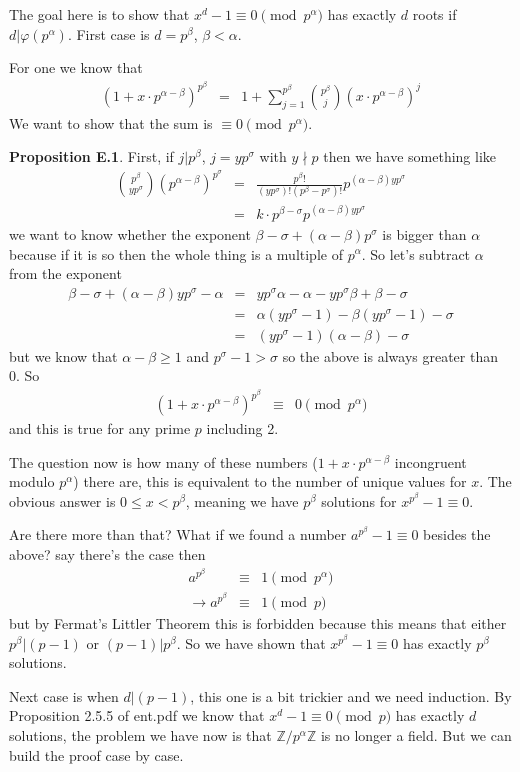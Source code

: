 \documentclass[aps,preprint,preprintnumbers,nofootinbib,showpacs,prd]{revtex4-1}
\newcommand{\nbea}{\begin{eqnarray*}}
\newcommand{\neea}{\end{eqnarray*}}
\begin{document}
The goal here is to show that $x^d - 1 \equiv 0 \pmod{p^\alpha}$ has exactly $d$ roots if $d|\varphi(p^\alpha)$. First case is $d = p^\beta$, $\beta < \alpha$.

For one we know that 
%
\nbea
(1 + x\cdot p^{\alpha-\beta})^{p^\beta} & = & 1 + \sum_{j=1}^{p^\beta}\binom{p^\beta}{j} (x\cdot p^{\alpha-\beta})^j
\neea
%
We want to show that the sum is $\equiv 0 \pmod{p^\alpha}$. 

{\bf Proposition E.1}. First, if $j|p^\beta$, $j = y p^\sigma$ with $y \nmid p$ then we have something like
%
\nbea
\binom{p^\beta}{y p^\sigma} (p^{\alpha-\beta})^{p^\sigma} & = & \frac{p^\beta !}{(yp^\sigma) ! (p^\beta - p^\sigma)!} p^{(\alpha-\beta){yp^\sigma}} \\
& = & k\cdot p^{\beta - \sigma}p^{(\alpha-\beta){yp^\sigma}}
\neea
%
we want to know whether the exponent ${\beta - \sigma}+{(\alpha-\beta){p^\sigma}}$ is bigger than $\alpha$ because if it is so then the whole thing is a multiple of $p^\alpha$. So let's subtract $\alpha$ from the exponent
%
\nbea
{\beta - \sigma}+{(\alpha-\beta){yp^\sigma}} - \alpha& = & yp^\sigma\alpha - \alpha - yp^\sigma\beta + \beta - \sigma \\
& = & \alpha(yp^\sigma - 1) - \beta(yp^\sigma - 1) - \sigma \\
& = & (yp^\sigma-1)(\alpha - \beta) - \sigma
\neea
%
but we know that $\alpha-\beta \ge 1$ and $p^\sigma - 1 > \sigma$ so the above is always greater than 0. So 
%
\nbea
(1 + x\cdot p^{\alpha-\beta})^{p^\beta} & \equiv & 0 \pmod{p^\alpha}
\neea
%
and this is true for any prime $p$ including 2.

The question now is how many of these numbers ($1 + x\cdot p^{\alpha-\beta}$ incongruent modulo $p^\alpha$) there are, this is equivalent to the number of unique values for $x$. The obvious answer is $0 \le x < p^\beta$, meaning we have $p^\beta$ solutions for $x^{p^\beta} - 1 \equiv 0$.

Are there more than that? What if we found a number $a^{p^\beta} - 1 \equiv 0$ besides the above? say there's the case then
%
\nbea
a^{p^\beta} & \equiv & 1 \pmod{p^\alpha} \\
\to a^{p^\beta} & \equiv & 1 \pmod{p}
\neea
%
but by Fermat's Littler Theorem this is forbidden because this means that either $p^\beta|(p-1)$ or $(p-1)|p^\beta$. So we have shown that $x^{p^\beta} - 1 \equiv 0$ has exactly $p^\beta$ solutions.

Next case is when $d|(p-1)$, this one is a bit trickier and we need induction. By Proposition 2.5.5 of ent.pdf we know that $x^d - 1\equiv 0 \pmod{p}$ has exactly $d$ solutions, the problem we have now is that $\mathbb{Z}/p^\alpha\mathbb{Z}$ is no longer a field. But we can build the proof case by case.
\end{document}
